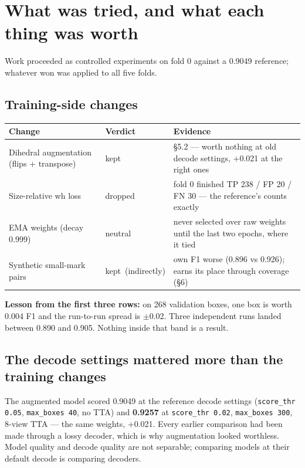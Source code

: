 \documentclass[11pt,a4paper]{article}
\newcommand{\cmark}{\textcolor{green!50!black}{kept}}
\newcommand{\xmark}{\textcolor{red!60!black}{dropped}}
\begin{document}
\section{What was tried, and what each thing was worth}

Work proceeded as controlled experiments on fold 0 against a 0.9049 reference; whatever won was
applied to all five folds.

\subsection{Training-side changes}

\begin{table}[h!]
\centering
\small
\renewcommand{\arraystretch}{1.2}
\begin{tabular}{@{}p{4.6cm}p{2.6cm}p{7.8cm}@{}}
\toprule
\textbf{Change} & \textbf{Verdict} & \textbf{Evidence} \\
\midrule
Dihedral augmentation (flips + transpose) & \cmark & \S 5.2 --- worth nothing at old decode settings, $+$0.021 at the right ones \\
Size-relative wh loss & \xmark & fold 0 finished TP 238 / FP 20 / FN 30 --- the reference's counts exactly \\
EMA weights (decay 0.999) & neutral & never selected over raw weights until the last two epochs, where it tied \\
Synthetic small-mark pairs & \cmark~(indirectly) & own F1 worse (0.896 vs 0.926); earns its place through coverage (\S 6) \\
\bottomrule
\end{tabular}
\end{table}

\textbf{Lesson from the first three rows:} on 268 validation boxes, one box is worth 0.004 F1 and
the run-to-run spread is $\pm$0.02. Three independent runs landed between 0.890 and 0.905.
Nothing inside that band is a result.

\subsection{The decode settings mattered more than the training changes}

The augmented model scored 0.9049 at the reference decode settings (\texttt{score\_thr 0.05},
\texttt{max\_boxes 40}, no TTA) and \textbf{0.9257} at \texttt{score\_thr 0.02},
\texttt{max\_boxes 300}, 8-view TTA --- the same weights, $+$0.021. Every earlier comparison had
been made through a lossy decoder, which is why augmentation looked worthless. Model quality and
decode quality are not separable; comparing models at their default decode is comparing decoders.
\end{document}
